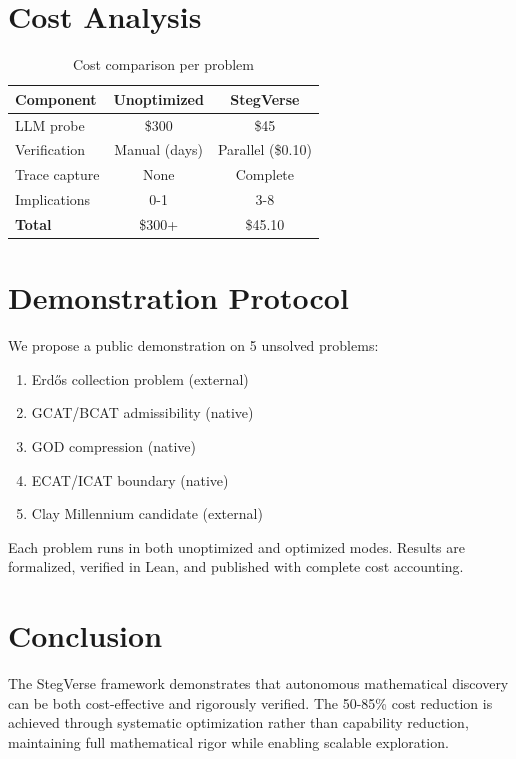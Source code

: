 \documentclass[11pt,a4paper]{article}
\theoremstyle{definition}
\begin{document}
\section{Cost Analysis}

\begin{table}[h]
\centering
\begin{tabular}{lcc}
\toprule
\textbf{Component} & \textbf{Unoptimized} & \textbf{StegVerse} \\ 
\midrule
LLM probe & \$300 & \$45 \\ 
Verification & Manual (days) & Parallel (\$0.10) \\ 
Trace capture & None & Complete \\ 
Implications & 0-1 & 3-8 \\ 
\midrule
\textbf{Total} & \$300+ & \$45.10 \\ 
\bottomrule
\end{tabular}
\caption{Cost comparison per problem}
\end{table}

\section{Demonstration Protocol}

We propose a public demonstration on 5 unsolved problems:
\begin{enumerate}
    \item Erd\H{o}s collection problem (external)
    \item GCAT/BCAT admissibility (native)
    \item GOD compression (native)
    \item ECAT/ICAT boundary (native)
    \item Clay Millennium candidate (external)
\end{enumerate}

Each problem runs in both unoptimized and optimized modes. Results are 
formalized, verified in Lean, and published with complete cost accounting.

\section{Conclusion}

The StegVerse framework demonstrates that autonomous mathematical discovery 
can be both cost-effective and rigorously verified. The 50-85\% cost reduction 
is achieved through systematic optimization rather than capability reduction, 
maintaining full mathematical rigor while enabling scalable exploration.
\end{document}
